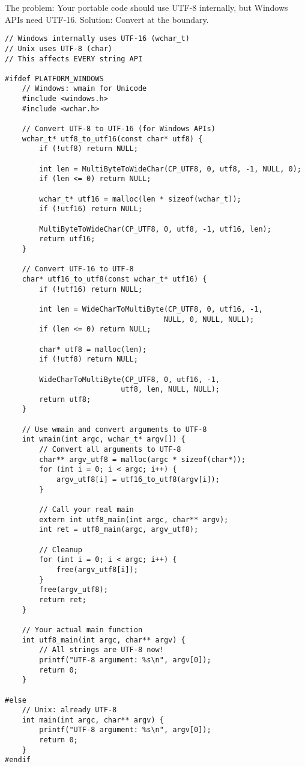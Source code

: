 The problem: Your portable code should use UTF-8 internally, but Windows APIs need UTF-16. Solution: Convert at the boundary.

\begin{lstlisting}
// Windows internally uses UTF-16 (wchar_t)
// Unix uses UTF-8 (char)
// This affects EVERY string API

#ifdef PLATFORM_WINDOWS
    // Windows: wmain for Unicode
    #include <windows.h>
    #include <wchar.h>

    // Convert UTF-8 to UTF-16 (for Windows APIs)
    wchar_t* utf8_to_utf16(const char* utf8) {
        if (!utf8) return NULL;

        int len = MultiByteToWideChar(CP_UTF8, 0, utf8, -1, NULL, 0);
        if (len <= 0) return NULL;

        wchar_t* utf16 = malloc(len * sizeof(wchar_t));
        if (!utf16) return NULL;

        MultiByteToWideChar(CP_UTF8, 0, utf8, -1, utf16, len);
        return utf16;
    }

    // Convert UTF-16 to UTF-8
    char* utf16_to_utf8(const wchar_t* utf16) {
        if (!utf16) return NULL;

        int len = WideCharToMultiByte(CP_UTF8, 0, utf16, -1,
                                     NULL, 0, NULL, NULL);
        if (len <= 0) return NULL;

        char* utf8 = malloc(len);
        if (!utf8) return NULL;

        WideCharToMultiByte(CP_UTF8, 0, utf16, -1,
                           utf8, len, NULL, NULL);
        return utf8;
    }

    // Use wmain and convert arguments to UTF-8
    int wmain(int argc, wchar_t* argv[]) {
        // Convert all arguments to UTF-8
        char** argv_utf8 = malloc(argc * sizeof(char*));
        for (int i = 0; i < argc; i++) {
            argv_utf8[i] = utf16_to_utf8(argv[i]);
        }

        // Call your real main
        extern int utf8_main(int argc, char** argv);
        int ret = utf8_main(argc, argv_utf8);

        // Cleanup
        for (int i = 0; i < argc; i++) {
            free(argv_utf8[i]);
        }
        free(argv_utf8);
        return ret;
    }

    // Your actual main function
    int utf8_main(int argc, char** argv) {
        // All strings are UTF-8 now!
        printf("UTF-8 argument: %s\n", argv[0]);
        return 0;
    }

#else
    // Unix: already UTF-8
    int main(int argc, char** argv) {
        printf("UTF-8 argument: %s\n", argv[0]);
        return 0;
    }
#endif
\end{lstlisting}

